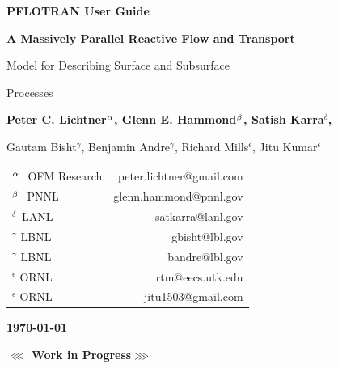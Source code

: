 \begin{center}

\dblline

\vspace{0.5 cm}

{\bf\huge PFLOTRAN User Guide}

\vspace{0.5cm}

{\bf\LARGE A Massively Parallel Reactive Flow and Transport 

Model for Describing Surface and Subsurface 

Processes}

\vspace{0.5cm}

{\bf\large Peter C. Lichtner${^{\alpha}}$, Glenn E. Hammond${^{\beta}}$, Satish Karra${^\delta}$, 

Gautam Bisht$^{\gamma}$, Benjamin Andre$^{\gamma}$, Richard Mills$^{\epsilon}$, Jitu Kumar$^{\epsilon}$}

\vspace{0.5cm}

\begin{tabular}{lr}
$^{{\alpha}_{~}}$ OFM Research & peter.lichtner@gmail.com\\
$^{{\beta}_{~}}$ PNNL & glenn.hammond@pnnl.gov\\
$^{\delta_{~}}$ LANL & satkarra@lanl.gov\\
$^{\gamma}$ LBNL & gbisht@lbl.gov\\
$^{\gamma}$ LBNL & bandre@lbl.gov\\
$^{\epsilon}$ ORNL & rtm@eecs.utk.edu \\
$^{\epsilon}$ ORNL & jitu1503@gmail.com
\end{tabular}

\vspace{0.5cm}

{\bf\large\today}


\vspace{1cm}

{\bf\LARGE $\lll$ Work in Progress$\ggg$}

\vspace{1cm}

\end{center}

